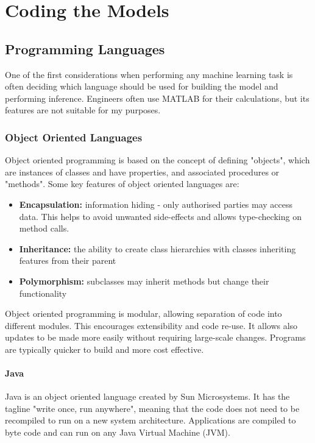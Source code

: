 \chapter{Coding the Models}

\section{Programming Languages}

One of the first considerations when performing any machine learning task is often deciding which language should be used for building the model and performing inference. Engineers often use MATLAB for their calculations, but its features are not suitable for my purposes.

\subsection{Object Oriented Languages}

Object oriented programming is based on the concept of defining "objects", which are instances of classes and have properties, and associated procedures or "methods". Some key features of object oriented languages are:

\begin{itemize}

\item \textbf{Encapsulation:} information hiding - only authorised parties may access data. This helps to avoid unwanted side-effects and allows type-checking on method calls.
\item \textbf{Inheritance:} the ability to create class hierarchies with classes inheriting features from their parent
\item \textbf{Polymorphism:} subclasses may inherit methods but change their functionality

\end{itemize}

Object oriented programming is modular, allowing separation of code into different modules. This encourages extensibility and code re-use. It allows also updates to be made more easily without requiring large-scale changes. Programs are typically quicker to build and more cost effective.

\subsubsection{Java}

Java is an object oriented language created by Sun Microsystems. It has the tagline "write once, run anywhere", meaning that the code does not need to be recompiled to run on a new system architecture. Applications are compiled to byte code and can run on any Java Virtual Machine (JVM).

